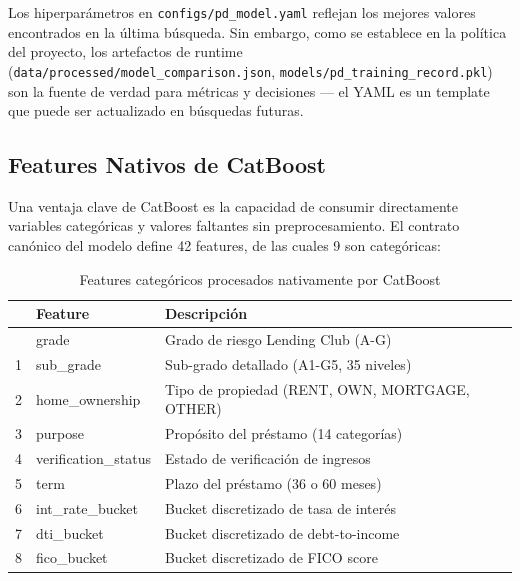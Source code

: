 \documentclass[
  spanish,
  11pt,
  letterpaper,
]{scrbook}
\theoremstyle{plain}
\theoremstyle{remark}
\begin{document}
\begin{tcolorbox}[enhanced jigsaw, arc=.35mm, bottomrule=.15mm, bottomtitle=1mm, breakable, colback=white, colbacktitle=quarto-callout-note-color!10!white, colframe=quarto-callout-note-color-frame, coltitle=black, left=2mm, leftrule=.75mm, opacityback=0, opacitybacktitle=0.6, rightrule=.15mm, title=\textcolor{quarto-callout-note-color}{\faInfo}\hspace{0.5em}{Configuración como template}, titlerule=0mm, toprule=.15mm, toptitle=1mm]

Los hiperparámetros en \texttt{configs/pd\_model.yaml} reflejan los
mejores valores encontrados en la última búsqueda. Sin embargo, como se
establece en la política del proyecto, los artefactos de runtime
(\texttt{data/processed/model\_comparison.json},
\texttt{models/pd\_training\_record.pkl}) son la fuente de verdad para
métricas y decisiones --- el YAML es un template que puede ser
actualizado en búsquedas futuras.

\end{tcolorbox}

\subsection{Features Nativos de CatBoost}\label{sec-catboost-features}

Una ventaja clave de CatBoost es la capacidad de consumir directamente
variables categóricas y valores faltantes sin preprocesamiento. El
contrato canónico del modelo define 42 features, de las cuales 9 son
categóricas:

{

\begin{longtable}[]{@{}lll@{}}

\caption{\label{tbl-catboost-categorical-features}Features categóricos
procesados nativamente por CatBoost}

\tabularnewline

\toprule\noalign{}
& Feature & Descripción \\
\midrule\noalign{}
\endhead
\bottomrule\noalign{}
\endlastfoot
0 & grade & Grado de riesgo Lending Club (A-G) \\
1 & sub\_grade & Sub-grado detallado (A1-G5, 35 niveles) \\
2 & home\_ownership & Tipo de propiedad (RENT, OWN, MORTGAGE, OTHER) \\
3 & purpose & Propósito del préstamo (14 categorías) \\
4 & verification\_status & Estado de verificación de ingresos \\
5 & term & Plazo del préstamo (36 o 60 meses) \\
6 & int\_rate\_bucket & Bucket discretizado de tasa de interés \\
7 & dti\_bucket & Bucket discretizado de debt-to-income \\
8 & fico\_bucket & Bucket discretizado de FICO score \\

\end{longtable}

}
\end{document}
